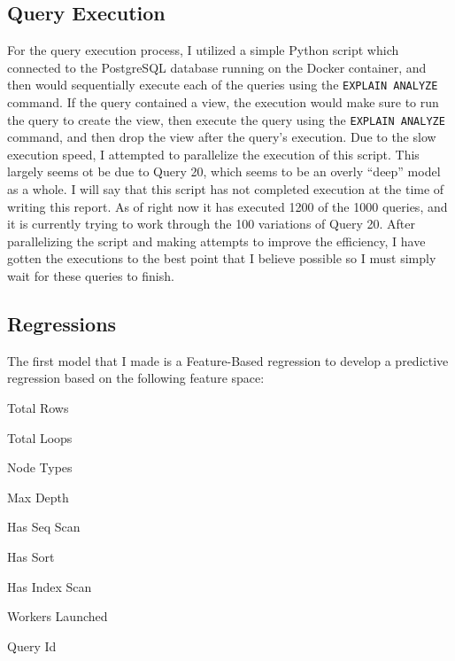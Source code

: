 \documentclass[sigconf]{acmart}
\begin{document}
\subsection{Query Execution}
For the query execution process, I utilized a simple Python script which connected to the PostgreSQL database running on the Docker container, and then would sequentially execute each of the queries
using the \texttt{EXPLAIN ANALYZE} command. If the query contained a view, the execution would make sure to run the query to create the view, then execute the query using the \texttt{EXPLAIN ANALYZE}
command, and then drop the view after the query's execution. Due to the slow execution speed, I attempted to parallelize the execution of this script. This largely seems ot be due to Query 20, which 
seems to be an overly ``deep'' model as a whole. I will say that this script has not completed execution at the time of writing this report. As of right now it has executed 1200 of the 1000 queries, and it
is currently trying to work through the 100 variations of Query 20. After parallelizing the script and making attempts to 
improve the efficiency, I have gotten the executions to the best point that I believe possible so I must simply wait for these queries to finish.

\subsection{Regressions}
The first model that I made is a Feature-Based regression  to develop a predictive regression based on the following feature space:
\begin{itemize}
  \begin{minipage}[t]{0.48\linewidth}
    \item Total Rows
    \item Total Loops
    \item Node Types
    \item Max Depth
    \item Has Seq Scan
  \end{minipage}
  \hfill
  \begin{minipage}[t]{0.48\linewidth}
    \item Has Sort
    \item Has Index Scan
    \item Workers Launched
    \item Query Id
  \end{minipage}
\end{itemize}
\end{document}
